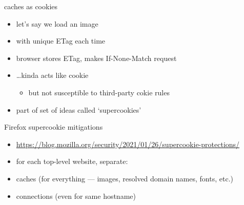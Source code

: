\begin{frame}{caches as cookies}
    \begin{itemize}
    \item let's say we load an image
    \item with unique ETag each time
    \vspace{.5cm}
    \item browser stores ETag, makes If-None-Match request
    \item \ldots kinda acts like cookie
        \begin{itemize}
        \item but not susceptible to third-party cokie rules
        \end{itemize}
    \vspace{.5cm}
    \item part of set of ideas called `supercookies'
    \end{itemize}
\end{frame}

\begin{frame}{Firefox supercookie mitigations}
    \begin{itemize}
    \item \url{https://blog.mozilla.org/security/2021/01/26/supercookie-protections/}
    \item for each top-level website, separate:
    \vspace{.5cm}
    \item caches (for everything --- images, resolved domain names, fonts, etc.)
    \item connections (even for same hostname)
    \end{itemize}
\end{frame}
